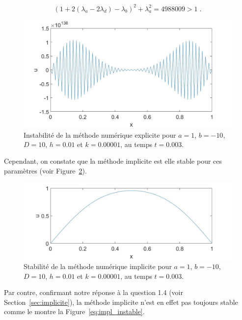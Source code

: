\documentclass[a4paper, 12pt]{report}
\begin{document}
\begin{equation}
\left ( 1+2(\lambda_a-2\lambda_d) - \lambda_b \right )^2 + \lambda_a^2 = 4988009 > 1 \;.
\end{equation}

\begin{figure}[H]
  \center
  \includegraphics[scale=0.4]{images/expl_instable_a1_b-10_D10_h0dot01_k0dot00001_tend_0dot003.jpg}
  \caption{Instabilité de la méthode numérique explicite pour $a=1$, $b=-10$, $D=10$, $h=0.01$ et $k=0.00001$, au temps $t=0.003$.}
  \label{eq:expl_instable}
\end{figure}

Cependant, on constate que la méthode implicite est elle stable pour ces
paramètres (voir Figure~\ref{eq:impl_stable}).

\begin{figure}[H]
  \center
  \includegraphics[scale=0.4]{images/impl_stable_a1_b-10_D10_h0dot01_k0dot00001_tend_0dot003.jpg}
  \caption{Stabilité de la méthode numérique implicite pour $a=1$, $b=-10$, $D=10$, $h=0.01$ et $k=0.00001$, au temps $t=0.003$.}
  \label{eq:impl_stable}
\end{figure}

Par contre, confirmant notre réponse à la question 1.4 (voir Section~\ref{sec:implicite}), la méthode implicite
n'est en effet pas toujours stable comme le montre la Figure~\ref{eq:impl_instable}.
\end{document}
